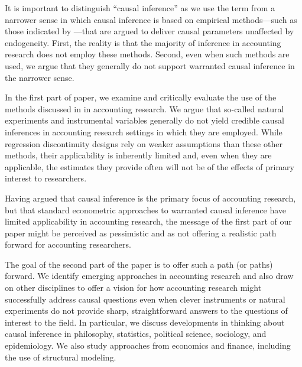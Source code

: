 \documentclass[11pt]{amsart}
\begin{document}
It is important to distinguish ``causal inference'' as we use the term from a narrower sense in which causal inference is based on empirical methods---such as those indicated by \cite{Angrist:2010jv}---that are argued to deliver causal parameters unaffected by endogeneity.
First, the reality is that the majority of inference in accounting research does not employ these methods.
Second, even when such methods are used, we argue that they generally do not support warranted causal inference in the narrower sense.

In the first part of paper, we examine and critically evaluate the use of the methods discussed in \cite{Angrist:2010jv} in accounting research.
We argue that so-called natural experiments and instrumental variables generally do not yield credible causal inferences in accounting research settings in which they are employed.
While regression discontinuity designs rely on weaker assumptions than these other methods, their applicability is inherently limited and, even when they are applicable, the estimates they provide often will not be of the effects of primary interest to researchers.

Having argued that causal inference is the primary focus of accounting research, but that standard econometric approaches to warranted causal inference have limited applicability in accounting research, the message of the first part of our paper might be perceived as pessimistic and as not offering a realistic path forward for accounting researchers. 

The goal of the second part of the paper is to offer such a path (or paths) forward. 
We identify emerging approaches in accounting research and also draw on other disciplines to offer a vision for how accounting research might successfully address causal questions even when clever instruments or natural experiments do not provide sharp, straightforward answers to the questions of interest to the field.
In particular, we discuss developments in thinking about causal inference in philosophy, statistics, political science, sociology, and epidemiology.
We also study approaches from economics and finance, including the  use of structural modeling.


\end{document}
